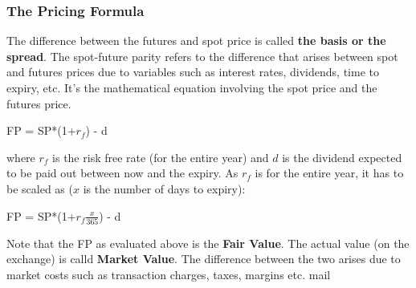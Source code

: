 \documentclass{article}
\begin{document}
\subsubsection{The Pricing Formula}
The difference between the futures and spot price is called \textbf{the basis or the spread}.
The spot-future parity refers to the difference that arises between spot and futures prices due
to variables such as interest rates, dividends, time to expiry, etc. It's the mathematical
equation involving the spot price and the futures price.
\begin{center}
    FP = SP*(1+$r_f$) - d
\end{center}
where $r_f$ is the risk free rate (for the entire year) and $d$ is the dividend
expected to be paid out between now and the expiry.
As $r_f$ is for the entire year, it has to be scaled as ($x$ is the number of
days to expiry):
\begin{center}
    FP = SP*(1+$r_f \frac{x}{365}$) - d
\end{center}
Note that the FP as evaluated above is the \textbf{Fair Value}. The actual
value (on the exchange) is calld \textbf{Market Value}. The difference between
the two arises due to market costs such as transaction charges, taxes, margins etc.
mail
\end{document}
